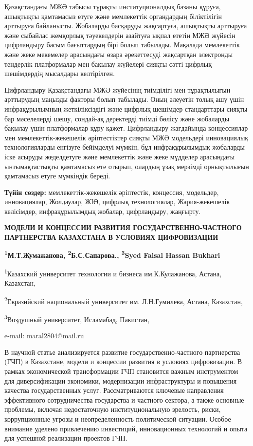 Қазақстандағы МЖӘ табысы тұрақты институционалдық базаны құруға,
ашықтықты қамтамасыз етуге және мемлекеттік органдардың біліктілігін
арттыруға байланысты. Жобаларды басқаруды жақсартуға, ашықтықты
арттыруға және сыбайлас жемқорлық тәуекелдерін азайтуға ықпал ететін МЖӘ
жүйесін цифрландыру басым бағыттардың бірі болып табылады. Мақалада
мемлекеттік және жеке мекемелер арасындағы өзара әрекеттесуді жақсартқан
электронды тендерлік платформалар мен бақылау жүйелері сияқты сәтті
цифрлық шешімдердің мысалдары келтірілген.

Цифрландыру Қазақстандағы МЖӘ жүйесінің тиімділігі мен тұрақтылығын
арттырудың маңызды факторы болып табылады. Оның әлеуетін толық ашу үшін
инфрақұрылымның жеткіліксіздігі және цифрлық шешімдер стандарттары
сияқты бар мәселелерді шешу, сондай-ақ деректерді тиімді бөлісу және
жобаларды бақылау үшін платформалар құру қажет. Цифрландыру жағдайында
концессиялар мен мемлекеттік-жекешелік әріптестіктер сияқты МЖӘ
модельдері инновациялық технологияларды енгізуге бейімделуі мүмкін, бұл
инфрақұрылымдық жобаларды іске асыруды жеделдетуге және мемлекеттік және
жеке мүдделер арасындағы ынтымақтастықты қамтамасыз ете отырып, олардың
ұзақ мерзімді орнықтылығын қамтамасыз етуге мүмкіндік береді.

{\bfseries Түйін сөздер:} мемлекеттік-жекешелік әріптестік, концессия,
модельдер, инновациялар, Жолдаулар, ЖІӨ, цифрлық технологиялар,
Жария-жекешелік келісімдер, инфрақұрылымдық жобалар, цифрландыру,
жаңғырту.

\begin{articleheader}
{\bfseries МОДЕЛИ И КОНЦЕССИИ РАЗВИТИЯ ГОСУДАРСТВЕННО-ЧАСТНОГО ПАРТНЕРСТВА КАЗАХСТАНА В УСЛОВИЯХ ЦИФРОВИЗАЦИИ}

{\bfseries
\textsuperscript{1}М.Т.Жумажанова\textsuperscript{\envelope },
\textsuperscript{2}Б.С.Сапарова.,
\textsuperscript{3}Syed Faisal Hassan Bukhari
}
\end{articleheader}

\begin{articleheader}
\textsuperscript{1}Казахский университет технологии и бизнеса им.К.Кулажанова, Астана, Казахстан,

\textsuperscript{2}Евразийский национальный университет им. Л.Н.Гумилева, Астана, Казахстан,

\textsuperscript{3}Воздушный университет, Исламабад, Пакистан,

e-mail: maral2804@mail.ru
\end{articleheader}

В научной статье анализируется развитие государственно-частного
партнерства (ГЧП) в Казахстане, модели и концессии развития в условиях
цифровизации. В рамках экономической трансформации ГЧП становится важным
инструментом для диверсификации экономики, модернизации инфраструктуры и
повышения качества государственных услуг. Рассматриваются ключевые
направления эффективного сотрудничества государства и частного сектора,
а также основные проблемы, включая недостаточную институциональную
зрелость, риски, коррупционные угрозы и неопределенность политической
ситуации. Особое внимание уделено привлечению инвестиций, инновационных
технологий и опыта для успешной реализации проектов ГЧП.

